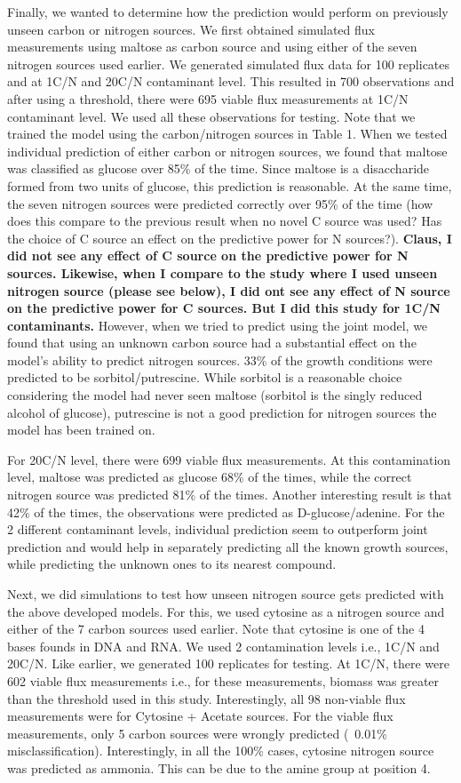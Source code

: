 \documentclass[12pt]{article}
\begin{document}
Finally, we wanted to determine how the prediction would perform on previously unseen carbon or nitrogen sources. We first obtained simulated flux measurements using maltose as carbon source and using either of the seven nitrogen sources used earlier. We generated simulated flux data for 100 replicates and at 1C/N and 20C/N contaminant level. This resulted in 700 observations and after using a threshold, there were 695 viable flux measurements at 1C/N contaminant level. We used all these observations for testing. Note that we trained the model using the carbon/nitrogen sources in Table 1. When we tested individual prediction of either carbon or nitrogen sources, we found that maltose was classified as glucose over 85\% of the time. Since maltose is a disaccharide formed from two units of glucose, this prediction is reasonable. At the same time, the seven nitrogen sources were predicted correctly over 95\% of the time ({\color{red}how does this compare to the previous result when no novel C source was used? Has the choice of C source an effect on the predictive power for N sources?}). \textbf{Claus, I did not see any effect of C source on the predictive power for N sources. Likewise, when I compare to the study where I used unseen nitrogen source (please see below), I did ont see any effect of N source on the predictive power for C sources. But I did this study for 1C/N contaminants.} However, when we tried to predict using the joint model, we found that using an unknown carbon source had a substantial effect on the model's ability to predict nitrogen sources. 33\% of the growth conditions were predicted to be sorbitol/putrescine. While sorbitol is a reasonable choice considering the model had never seen maltose (sorbitol is the singly reduced alcohol of glucose), putrescine is not a good prediction for nitrogen sources the model has been trained on.

For 20C/N level, there were 699 viable flux measurements. At this contamination level, maltose was predicted as glucose 68\% of the times, while the correct nitrogen source was predicted 81\% of the times. Another interesting result is that 42\% of the times, the observations were predicted as D-glucose/adenine. For the 2 different contaminant levels, individual prediction seem to outperform joint prediction and would help in separately predicting all the known growth sources, while predicting the unknown ones to its nearest compound.

Next, we did simulations to test how unseen nitrogen source gets predicted with the above developed models. For this, we used cytosine as a nitrogen source and either of the 7 carbon sources used earlier. Note that cytosine is one of the 4 bases founds in DNA and RNA. We used 2 contamination levels i.e., 1C/N and 20C/N. Like earlier, we generated 100 replicates for testing. At 1C/N, there were 602 viable flux measurements i.e., for these measurements, biomass was greater than the threshold used in this study. Interestingly, all 98 non-viable flux measurements were for Cytosine + Acetate sources. For the viable flux measurements, only 5 carbon sources were wrongly predicted (~0.01\% misclassification). Interestingly, in all the 100\% cases, cytosine nitrogen source was predicted as ammonia. This can be due to the amine group at position 4.
\end{document}
